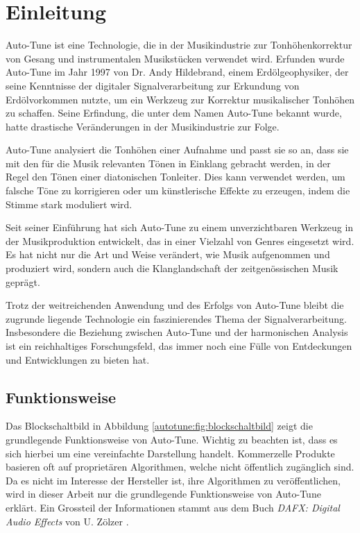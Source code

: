 %
%
%
%
\section{Einleitung\label{autotune:section:teil0}}
Auto-Tune ist eine Technologie, die in der Musikindustrie zur Tonhöhenkorrektur von Gesang und instrumentalen Musikstücken verwendet wird.
Erfunden wurde Auto-Tune im Jahr 1997 von Dr. Andy Hildebrand, einem Erdölgeophysiker,
der seine Kenntnisse der digitaler Signalverarbeitung zur Erkundung von Erdölvorkommen nutzte,
um ein Werkzeug zur Korrektur musikalischer Tonhöhen zu schaffen.
Seine Erfindung, die unter dem Namen Auto-Tune bekannt wurde, hatte drastische Veränderungen in der Musikindustrie zur Folge.

Auto-Tune analysiert die Tonhöhen einer Aufnahme und passt sie so an, dass sie mit den für die Musik relevanten Tönen in Einklang gebracht werden,
in der Regel den Tönen einer diatonischen Tonleiter.
Dies kann verwendet werden, um falsche Töne zu korrigieren oder um künstlerische Effekte zu erzeugen, indem die Stimme stark moduliert wird.

Seit seiner Einführung hat sich Auto-Tune zu einem unverzichtbaren Werkzeug in der Musikproduktion entwickelt,
das in einer Vielzahl von Genres eingesetzt wird.
Es hat nicht nur die Art und Weise verändert, wie Musik aufgenommen und produziert wird,
sondern auch die Klanglandschaft der zeitgenössischen Musik geprägt.

Trotz der weitreichenden Anwendung und des Erfolgs von Auto-Tune bleibt die zugrunde liegende Technologie ein faszinierendes Thema der Signalverarbeitung.
Insbesondere die Beziehung zwischen Auto-Tune und der harmonischen Analysis ist ein reichhaltiges Forschungsfeld,
das immer noch eine Fülle von Entdeckungen und Entwicklungen zu bieten hat.


\subsection{Funktionsweise
\label{autotune:subsection:funktionsweise}}
Das Blockschaltbild in Abbildung \ref{autotune:fig:blockschaltbild} zeigt die grundlegende Funktionsweise von Auto-Tune.
Wichtig zu beachten ist, dass es sich hierbei um eine vereinfachte Darstellung handelt.
Kommerzelle Produkte basieren oft auf proprietären Algorithmen, welche nicht öffentlich zugänglich sind.
Da es nicht im Interesse der Hersteller ist, ihre Algorithmen zu veröffentlichen,
wird in dieser Arbeit nur die grundlegende Funktionsweise von Auto-Tune erklärt.
Ein Grossteil der Informationen stammt aus dem Buch \emph{DAFX: Digital Audio Effects} von U. Zölzer \cite{autotune:digitalAudioEffects}.

